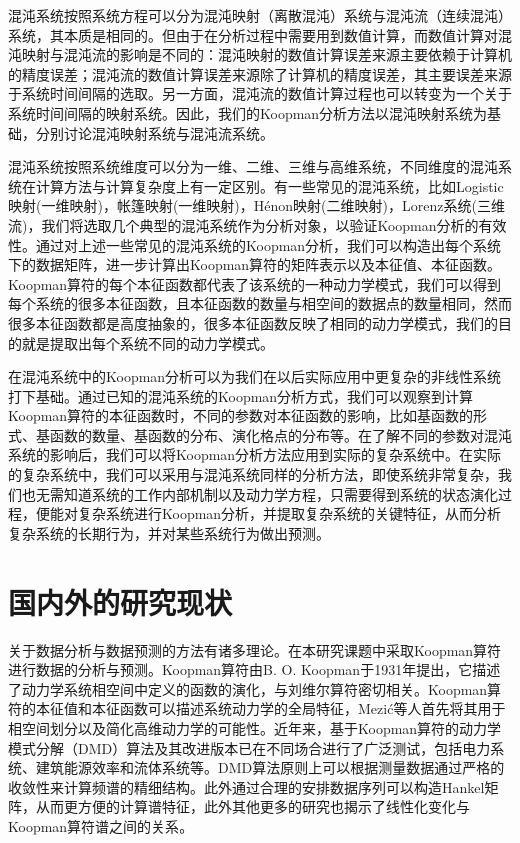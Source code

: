 混沌系统按照系统方程可以分为混沌映射（离散混沌）系统与混沌流（连续混沌）系统，其本质是相同的。但由于在分析过程中需要用到数值计算，而数值计算对混沌映射与混沌流的影响是不同的：混沌映射的数值计算误差来源主要依赖于计算机的精度误差；混沌流的数值计算误差来源除了计算机的精度误差，其主要误差来源于系统时间间隔的选取。另一方面，混沌流的数值计算过程也可以转变为一个关于系统时间间隔的映射系统\cite{strogatz2001nonlinear}。因此，我们的Koopman分析方法以混沌映射系统为基础，分别讨论混沌映射系统与混沌流系统。

混沌系统按照系统维度可以分为一维、二维、三维与高维系统，不同维度的混沌系统在计算方法与计算复杂度上有一定区别。有一些常见的混沌系统，比如Logistic映射\cite{phatak1995logistic}(一维映射)，帐篷映射\cite{yoshida1983analytic}(一维映射)，H\'{e}non映射\cite{henon1976two}(二维映射)，Lorenz系统\cite{lorenz1963deterministic}(三维流)，我们将选取几个典型的混沌系统作为分析对象，以验证Koopman分析的有效性。通过对上述一些常见的混沌系统的Koopman分析，我们可以构造出每个系统下的数据矩阵，进一步计算出Koopman算符的矩阵表示以及本征值、本征函数。Koopman算符的每个本征函数都代表了该系统的一种动力学模式，我们可以得到每个系统的很多本征函数，且本征函数的数量与相空间的数据点的数量相同，然而很多本征函数都是高度抽象的，很多本征函数反映了相同的动力学模式，我们的目的就是提取出每个系统不同的动力学模式。

在混沌系统中的Koopman分析可以为我们在以后实际应用中更复杂的非线性系统打下基础。通过已知的混沌系统的Koopman分析方式，我们可以观察到计算Koopman算符的本征函数时，不同的参数对本征函数的影响，比如基函数的形式、基函数的数量、基函数的分布、演化格点的分布等。在了解不同的参数对混沌系统的影响后，我们可以将Koopman分析方法应用到实际的复杂系统中。在实际的复杂系统中，我们可以采用与混沌系统同样的分析方法，即使系统非常复杂，我们也无需知道系统的工作内部机制以及动力学方程，只需要得到系统的状态演化过程，便能对复杂系统进行Koopman分析，并提取复杂系统的关键特征，从而分析复杂系统的长期行为，并对某些系统行为做出预测。

\section{国内外的研究现状}
关于数据分析与数据预测的方法有诸多理论。在本研究课题中采取Koopman算符进行数据的分析与预测。Koopman算符由B. O. Koopman于1931年提出\cite{koopman1931hamiltonian}，它描述了动力学系统相空间中定义的函数的演化，与刘维尔算符密切相关\cite{gaspard1995spectral,gaspard2001liouvillian}。Koopman算符的本征值和本征函数可以描述系统动力学的全局特征\cite{budivsic2012applied}，Mezi\'{c}等人首先将其用于相空间划分\cite{mezic2004comparison}以及简化高维动力学\cite{mezic2005spectral}的可能性。近年来，基于Koopman算符的动力学模式分解（DMD）算法及其改进版本已在不同场合进行了广泛测试，包括电力系统\cite{susuki2011nonlinear,susuki2012nonlinear}、建筑能源效率\cite{eisenhower2010decomposing,georgescu2012creating}和流体系统\cite{schmid2011applications,bagheri2013koopman,mezic2013analysis}等。DMD算法\cite{schmid2010dynamic}原则上可以根据测量数据通过严格的收敛性来计算频谱的精细结构\cite{korda2020data}。此外通过合理的安排数据序列可以构造Hankel矩阵\cite{arbabi2017ergodic}，从而更方便的计算谱特征，此外其他更多的研究也揭示了线性化变化与Koopman算符谱之间的关系\cite{lan2013linearization}。

